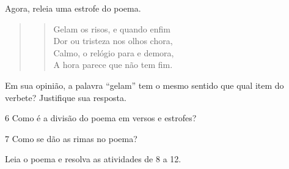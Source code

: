 Agora, releia uma estrofe do poema.

\begin{quote}
\begin{verse}
Gelam os risos, e quando enfim\\
Dor ou tristeza nos olhos chora,\\
Calmo, o relógio para e demora,\\
A hora parece que não tem fim.
\end{verse}
\end{quote}

Em sua opinião, a palavra ``gelam'' tem o mesmo sentido que qual item do verbete? Justifique sua resposta.


\num{6} Como é a divisão do poema em versos e estrofes?


\num{7} Como se dão as rimas no poema?


Leia o poema e resolva as atividades de 8 a 12.



